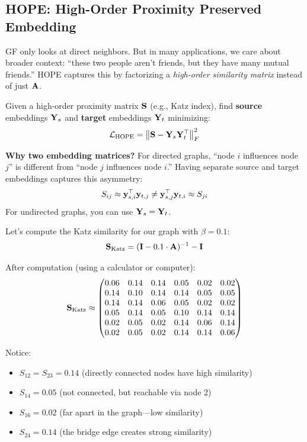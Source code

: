 \begin{notechapter}
\subsection{HOPE: High-Order Proximity Preserved Embedding}

\begin{whybox}
GF only looks at direct neighbors. But in many applications, we care about broader context: ``these two people aren't friends, but they have many mutual friends.'' HOPE captures this by factorizing a \emph{high-order similarity matrix} instead of just $\mathbf{A}$.
\end{whybox}

\begin{definition}
Given a high-order proximity matrix $\mathbf{S}$ (e.g., Katz index), find \textbf{source} embeddings $\mathbf{Y}_s$ and \textbf{target} embeddings $\mathbf{Y}_t$ minimizing:
\[
\mathcal{L}_{\text{HOPE}} = \left\| \mathbf{S} - \mathbf{Y}_s \mathbf{Y}_t^\top \right\|_F^2
\]
\end{definition}

\begin{keyinsight}
\textbf{Why two embedding matrices?} For directed graphs, ``node $i$ influences node $j$'' is different from ``node $j$ influences node $i$.'' Having separate source and target embeddings captures this asymmetry:
\[
S_{ij} \approx \mathbf{y}_{s,i}^\top \mathbf{y}_{t,j} \neq \mathbf{y}_{s,j}^\top \mathbf{y}_{t,i} \approx S_{ji}
\]
For undirected graphs, you can use $\mathbf{Y}_s = \mathbf{Y}_t$.
\end{keyinsight}

\begin{example}
Let's compute the Katz similarity for our graph with $\beta = 0.1$:
\[
\mathbf{S}_{\text{Katz}} = (\mathbf{I} - 0.1 \cdot \mathbf{A})^{-1} - \mathbf{I}
\]

After computation (using a calculator or computer):
\[
\mathbf{S}_{\text{Katz}} \approx \begin{pmatrix}
0.06 & 0.14 & 0.14 & 0.05 & 0.02 & 0.02 \\
0.14 & 0.10 & 0.14 & 0.14 & 0.05 & 0.05 \\
0.14 & 0.14 & 0.06 & 0.05 & 0.02 & 0.02 \\
0.05 & 0.14 & 0.05 & 0.10 & 0.14 & 0.14 \\
0.02 & 0.05 & 0.02 & 0.14 & 0.06 & 0.14 \\
0.02 & 0.05 & 0.02 & 0.14 & 0.14 & 0.06
\end{pmatrix}
\]

Notice:
\begin{itemize}
    \item $S_{12} = S_{23} = 0.14$ (directly connected nodes have high similarity)
    \item $S_{14} = 0.05$ (not connected, but reachable via node 2)
    \item $S_{16} = 0.02$ (far apart in the graph---low similarity)
    \item $S_{24} = 0.14$ (the bridge edge creates strong similarity)
\end{itemize}


\end{example}
\end{notechapter}
